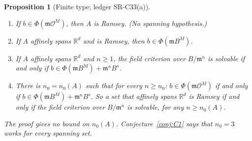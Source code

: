 \documentclass[11pt]{amsart}
\newcommand{\R}{\mathbb{R}}
\theoremstyle{plain}
\newtheorem{proposition}[theorem]{Proposition}
\theoremstyle{definition}
\begin{document}
\begin{proposition}[Finite type; ledger SR-C33(a)]\label{prop:finitetype}
\begin{enumerate}
\item[(i)] If $b\in\Phi(\mathfrak m\mathcal O^M)$, then $A$ is Ramsey. (No spanning hypothesis.)
\item[(ii)] If $A$ affinely spans $\R^d$ and is Ramsey, then $b\in\Phi(\mathfrak mB^M)$.
\item[(iii)] If $A$ affinely spans $\R^d$ and $n\ge1$, the field criterion over $B/\mathfrak m^n$ is
solvable if and only if $b\in\Phi(\mathfrak mB^M)+\mathfrak m^nB^s$.
\item[(iv)] There is $n_0=n_0(A)$ such that for every $n\ge n_0$:
$b\in\Phi(\mathfrak m\mathcal O^M)$ if and only if $b\in\Phi(\mathfrak mB^M)+\mathfrak m^nB^s$. So a set
that affinely spans $\R^d$ is Ramsey if and only if the field criterion over $B/\mathfrak m^n$ is solvable,
for any $n\ge n_0(A)$.
\end{enumerate}
The proof gives no bound on $n_0(A)$. Conjecture~\ref{conj:C1} says that $n_0=3$ works for every spanning
set.
\end{proposition}
\end{document}
